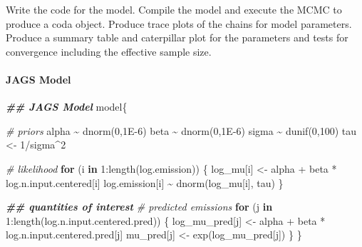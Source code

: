 \documentclass[
]{article}
\newenvironment{Shaded}{\begin{snugshade}}{\end{snugshade}}
\newcommand{\CommentTok}[1]{\textcolor[rgb]{0.56,0.35,0.01}{\textit{#1}}}
\newcommand{\ControlFlowTok}[1]{\textcolor[rgb]{0.13,0.29,0.53}{\textbf{#1}}}
\newcommand{\DecValTok}[1]{\textcolor[rgb]{0.00,0.00,0.81}{#1}}
\newcommand{\DocumentationTok}[1]{\textcolor[rgb]{0.56,0.35,0.01}{\textbf{\textit{#1}}}}
\newcommand{\FloatTok}[1]{\textcolor[rgb]{0.00,0.00,0.81}{#1}}
\newcommand{\FunctionTok}[1]{\textcolor[rgb]{0.00,0.00,0.00}{#1}}
\newcommand{\NormalTok}[1]{#1}
\newcommand{\OtherTok}[1]{\textcolor[rgb]{0.56,0.35,0.01}{#1}}
\newcommand{\SpecialCharTok}[1]{\textcolor[rgb]{0.00,0.00,0.00}{#1}}
\begin{document}
Write the code for the model. Compile the model and execute the MCMC to
produce a coda object. Produce trace plots of the chains for model
parameters. Produce a summary table and caterpillar plot for the
parameters and tests for convergence including the effective sample
size.

\hypertarget{jags-model}{%
\paragraph{JAGS Model}\label{jags-model}}

\begin{Shaded}
\begin{Highlighting}[]
\DocumentationTok{\#\# JAGS Model}
\NormalTok{model\{}
  
  \CommentTok{\# priors}
\NormalTok{  alpha }\SpecialCharTok{\textasciitilde{}} \FunctionTok{dnorm}\NormalTok{(}\DecValTok{0}\NormalTok{,}\FloatTok{1E{-}6}\NormalTok{)}
\NormalTok{  beta }\SpecialCharTok{\textasciitilde{}} \FunctionTok{dnorm}\NormalTok{(}\DecValTok{0}\NormalTok{,}\FloatTok{1E{-}6}\NormalTok{)}
\NormalTok{  sigma }\SpecialCharTok{\textasciitilde{}} \FunctionTok{dunif}\NormalTok{(}\DecValTok{0}\NormalTok{,}\DecValTok{100}\NormalTok{)}
\NormalTok{  tau }\OtherTok{\textless{}{-}} \DecValTok{1}\SpecialCharTok{/}\NormalTok{sigma}\SpecialCharTok{\^{}}\DecValTok{2}

  \CommentTok{\# likelihood}
  \ControlFlowTok{for}\NormalTok{ (i }\ControlFlowTok{in} \DecValTok{1}\SpecialCharTok{:}\FunctionTok{length}\NormalTok{(log.emission)) \{}
\NormalTok{    log\_mu[i] }\OtherTok{\textless{}{-}}\NormalTok{ alpha }\SpecialCharTok{+}\NormalTok{ beta }\SpecialCharTok{*}\NormalTok{ log.n.input.centered[i]}
\NormalTok{    log.emission[i] }\SpecialCharTok{\textasciitilde{}} \FunctionTok{dnorm}\NormalTok{(log\_mu[i], tau)}
\NormalTok{  \}}

  \DocumentationTok{\#\# quantities of interest}
    \CommentTok{\# predicted emissions}
    \ControlFlowTok{for}\NormalTok{ (j }\ControlFlowTok{in} \DecValTok{1}\SpecialCharTok{:}\FunctionTok{length}\NormalTok{(log.n.input.centered.pred)) \{}
\NormalTok{      log\_mu\_pred[j] }\OtherTok{\textless{}{-}}\NormalTok{ alpha }\SpecialCharTok{+}\NormalTok{ beta }\SpecialCharTok{*}\NormalTok{ log.n.input.centered.pred[j]}
\NormalTok{      mu\_pred[j] }\OtherTok{\textless{}{-}} \FunctionTok{exp}\NormalTok{(log\_mu\_pred[j])}
\NormalTok{    \}}
\NormalTok{\}}
\end{Highlighting}
\end{Shaded}
\end{document}
